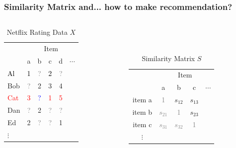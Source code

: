 \documentclass[xcolor={dvipsnames}]{beamer}
\begin{document}
\frame
{
\frametitle{Similarity Matrix and... {{how to make recommendation?}}}


\begin{columns}
\begin{column}{.5\textwidth}

\begin{table}
\begin{tabular}{|l|ccccc|}
\hline
  & \multicolumn{5}{|c|}{Item} \\
    & a & b & c & d & $\cdots$ \\ \hline
\textcolor{black}{Al} & \textcolor{black}{1} & \textcolor{gray}{?} & \textcolor{black}{2 }& \textcolor{gray}{?} &\\ 
Bob & \textcolor{gray}{?} & 2 & 3 & 4 &\\ 
\textcolor{red}{Cat} & \textcolor{red}{3} & \textcolor{blue}{?} & \textcolor{red}{1} & \textcolor{red}{5}&\\ 
Dan & \textcolor{gray}{?} & 2 & \textcolor{gray}{?} & \textcolor{gray}{?}& \\
Ed & 2 &   \textcolor{gray}{?} & \textcolor{gray}{?} & 1&\\
$\vdots$ &&&&&\\ \hline
\end{tabular}
\caption{Netflix Rating Data $X$}
\end{table}


\end{column}
\begin{column}{.5\textwidth}

\vspace{-.4em}
${}$\\${}$\\

\begin{table}
\begin{tabular}{c||c|c|c|c||}
  & \multicolumn{4}{|c||}{Item}  \\
& a &  b &  c & $\cdots$ \\\hline \hline
item a &\textcolor{gray}{1}&$s_{12}$&$s_{13}$& \\ \hline
item b &\textcolor{gray}{$s_{21}$}&\textcolor{gray}{1}&$s_{23}$& \\ \hline
item c &\textcolor{gray}{$s_{31}$}&\textcolor{gray}{$s_{32}$}&\textcolor{gray}{1}& \\ \hline
$\vdots$ &&&& \\ \hline \hline
\end{tabular}
\caption{Similarity Matrix $S$}  
\end{table}

\end{column}
\end{columns}


}
\end{document}
